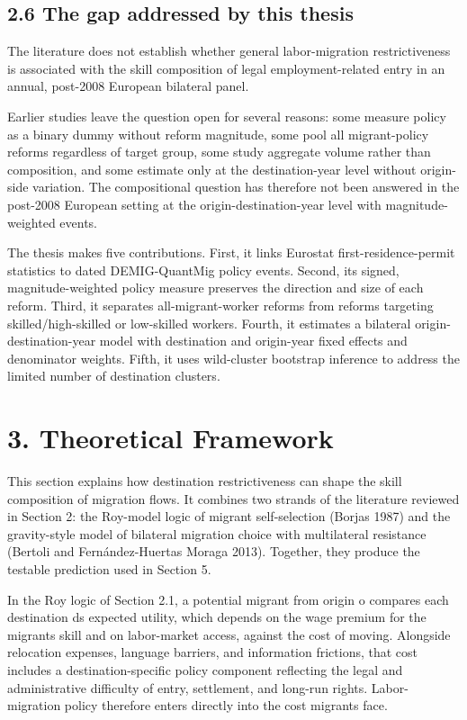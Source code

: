 \documentclass[11pt,a4paper]{article}
\begin{document}
\subsection{2.6 The gap addressed by this
thesis}\label{the-gap-addressed-by-this-thesis}

The literature does not establish whether general labor-migration
restrictiveness is associated with the skill composition of legal
employment-related entry in an annual, post-2008 European bilateral
panel.

Earlier studies leave the question open for several reasons: some
measure policy as a binary dummy without reform magnitude, some pool all
migrant-policy reforms regardless of target group, some study aggregate
volume rather than composition, and some estimate only at the
destination-year level without origin-side variation. The compositional
question has therefore not been answered in the post-2008 European
setting at the origin-destination-year level with magnitude-weighted
events.

The thesis makes five contributions. First, it links Eurostat
first-residence-permit statistics to dated DEMIG-QuantMig policy events.
Second, its signed, magnitude-weighted policy measure preserves the
direction and size of each reform. Third, it separates
all-migrant-worker reforms from reforms targeting skilled/high-skilled
or low-skilled workers. Fourth, it estimates a bilateral
origin-destination-year model with destination and origin-year fixed
effects and denominator weights. Fifth, it uses wild-cluster bootstrap
inference to address the limited number of destination clusters.

\clearpage
\section{3. Theoretical Framework}\label{theoretical-framework}

This section explains how destination restrictiveness can shape the
skill composition of migration flows. It combines two strands of the
literature reviewed in Section 2: the Roy-model logic of migrant
self-selection (Borjas 1987) and the gravity-style model of bilateral
migration choice with multilateral resistance (Bertoli and
Fernández-Huertas Moraga 2013). Together, they produce the testable
prediction used in Section 5.

In the Roy logic of Section 2.1, a potential migrant from origin o
compares each destination d\textquotesingle s expected utility, which
depends on the wage premium for the migrant\textquotesingle s skill and
on labor-market access, against the cost of moving. Alongside relocation
expenses, language barriers, and information frictions, that cost
includes a destination-specific policy component reflecting the legal
and administrative difficulty of entry, settlement, and long-run rights.
Labor-migration policy therefore enters directly into the cost migrants
face.
\end{document}
